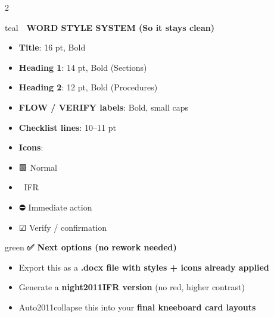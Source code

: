 \documentclass[10pt]{article}
\begin{document}
\begin{multicols}{2}
\begin{sectbox}{teal}
  {\small\textbf{🎨 WORD STYLE SYSTEM (So it stays clean)}}
\end{sectbox}
\vspace{1mm}
\begin{itemize}[left=0pt,label={},labelsep=2mm]
  \item {\scriptsize \textbf{Title}: 16 pt, Bold}
  \item {\scriptsize \textbf{Heading 1}: 14 pt, Bold (Sections)}
  \item {\scriptsize \textbf{Heading 2}: 12 pt, Bold (Procedures)}
  \item {\scriptsize \textbf{FLOW / VERIFY labels}: Bold, small caps}
  \item {\scriptsize \textbf{Checklist lines}: 10--11 pt}
  \item {\scriptsize \textbf{Icons}:}
  \item {\scriptsize 🟩 Normal}
  \item {\scriptsize 🔵 IFR}
  \item {\scriptsize ⛔ Immediate action}
  \item {\scriptsize ☑ Verify / confirmation}
\end{itemize}

\vspace{2mm}
\begin{sectbox}{green}
  {\small\textbf{✅ Next options (no rework needed)}}
\end{sectbox}
\vspace{1mm}
\begin{itemize}[left=0pt,label={},labelsep=2mm]
  \item {\scriptsize Export this as a \textbf{.docx file with styles + icons already applied}}
  \item {\scriptsize Generate a \textbf{night\x2011IFR version} (no red, higher contrast)}
  \item {\scriptsize Auto\x2011collapse this into your \textbf{final kneeboard card layouts}}
\end{itemize}

\vfill
\end{multicols}
\end{document}
